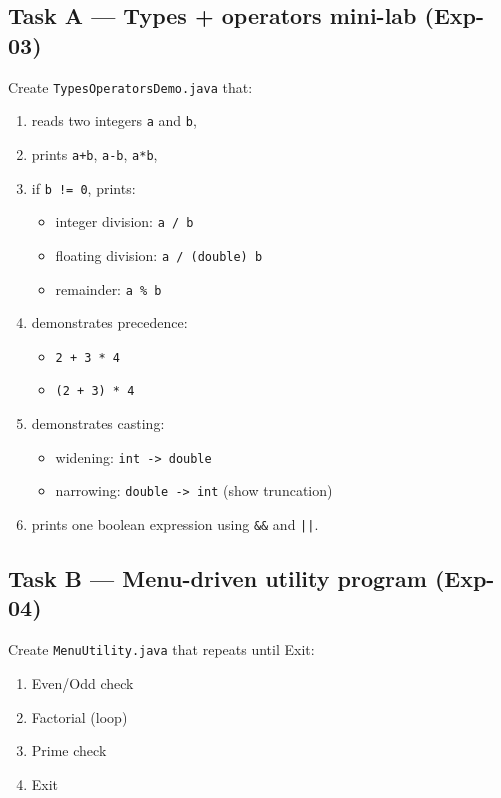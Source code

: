 \documentclass[11pt]{article}
\begin{document}
\subsection{Task A --- Types + operators mini-lab (Exp-03)}
Create \texttt{TypesOperatorsDemo.java} that:
\begin{enumerate}[leftmargin=*]
  \item reads two integers \texttt{a} and \texttt{b},
  \item prints \texttt{a+b}, \texttt{a-b}, \texttt{a*b},
  \item if \texttt{b != 0}, prints:
  \begin{itemize}[leftmargin=*]
    \item integer division: \texttt{a / b}
    \item floating division: \texttt{a / (double) b}
    \item remainder: \texttt{a \% b}
  \end{itemize}
  \item demonstrates precedence:
  \begin{itemize}[leftmargin=*]
    \item \texttt{2 + 3 * 4}
    \item \texttt{(2 + 3) * 4}
  \end{itemize}
  \item demonstrates casting:
  \begin{itemize}[leftmargin=*]
    \item widening: \texttt{int -> double}
    \item narrowing: \texttt{double -> int} (show truncation)
  \end{itemize}
  \item prints one boolean expression using \texttt{\&\&} and \texttt{||}.
\end{enumerate}

\subsection{Task B --- Menu-driven utility program (Exp-04)}
Create \texttt{MenuUtility.java} that repeats until Exit:
\begin{enumerate}[leftmargin=*]
  \item Even/Odd check
  \item Factorial (loop)
  \item Prime check
  \item Exit
\end{enumerate}
\end{document}
